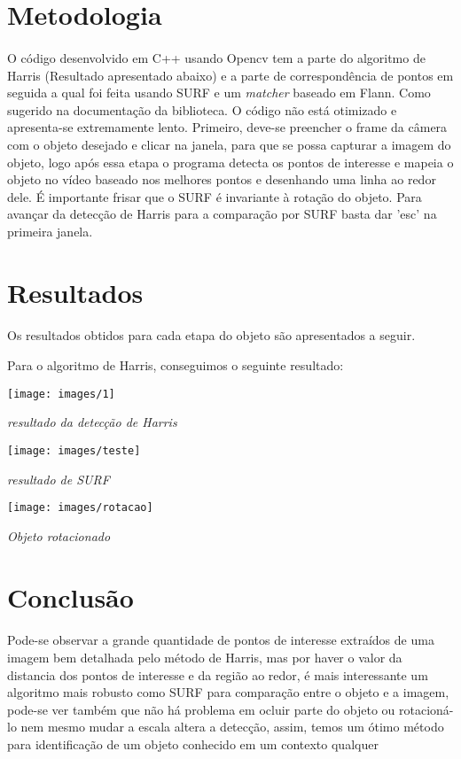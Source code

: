 \documentclass[conference,harvard,brazil,english]{sbatex}
\begin{document}
	\section{Metodologia}
	\paragraph{}
		O código desenvolvido em C++ usando Opencv tem a parte do algoritmo de Harris (Resultado apresentado abaixo) e a parte de correspondência de pontos em seguida a qual foi feita usando SURF e um \textit{matcher} baseado em Flann. Como sugerido na documentação da biblioteca. O código não está otimizado e apresenta-se extremamente lento. Primeiro, deve-se preencher o frame da câmera com o objeto desejado e clicar na janela, para que se possa capturar a imagem do objeto, logo após essa etapa o programa detecta os pontos de interesse e mapeia o objeto no vídeo baseado nos melhores pontos e desenhando uma linha ao redor dele. É importante frisar que o SURF é invariante à rotação do objeto. 
		Para avançar da detecção de Harris para a comparação por SURF basta dar 'esc' na primeira janela.
	\section{Resultados}
	\paragraph{}
		Os resultados obtidos para cada etapa do objeto são apresentados a seguir.
		
		\par Para o algoritmo de Harris, conseguimos o seguinte resultado:
		
		\centerline{\texttt{[image: images/1]}}
		\centerline{\textit{resultado da detecção de Harris}}\par
		\centerline{\texttt{[image: images/teste]}}
		\centerline{\textit{resultado de SURF}}\par
		\centerline{\texttt{[image: images/rotacao]}}
		\centerline{\textit{Objeto rotacionado}}
	\section{Conclusão}
	\paragraph{}
		Pode-se observar a grande quantidade de pontos de interesse extraídos de uma imagem bem detalhada pelo método de Harris, mas por haver o valor da distancia dos pontos de interesse e da região ao redor, é mais interessante um algoritmo mais robusto como SURF para comparação entre o objeto e a imagem, pode-se ver também que não há problema em ocluir parte do objeto ou rotacioná-lo nem mesmo mudar a escala altera a detecção, assim, temos um ótimo método para identificação de um objeto conhecido em um contexto qualquer
\end{document}
